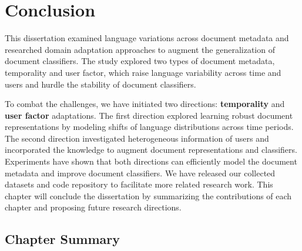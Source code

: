 \chapter{Conclusion}
\label{chp:conclusion}

This dissertation examined language variations across document metadata and researched domain adaptation approaches to augment the generalization of document classifiers.
The study explored two types of document metadata, temporality and user factor, which raise language variability across time and users and hurdle the stability of document classifiers.

To combat the challenges, we have initiated two directions: \textbf{temporality} and \textbf{user factor} adaptations.
The first direction explored learning robust document representations by modeling shifts of language distributions across time periods.
The second direction investigated heterogeneous information of users and incorporated the knowledge to augment document representations and classifiers.
Experiments have shown that both directions can efficiently model the document metadata and improve document classifiers.
We have released our collected datasets and code repository to facilitate more related research work.
This chapter will conclude the dissertation by summarizing the contributions of each chapter and proposing future research directions.

\section{Chapter Summary}


